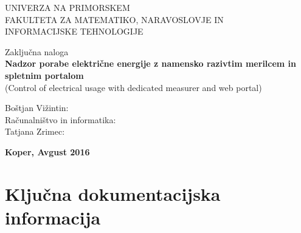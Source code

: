 \documentclass[12pt,a4paper,titlepage,openany]{report}
\begin{document}
\pagestyle{empty}
\begin{center}
\noindent \large UNIVERZA NA PRIMORSKEM\\
\large FAKULTETA ZA MATEMATIKO, NARAVOSLOVJE IN\\
INFORMACIJSKE TEHNOLOGIJE


\normalsize
\vspace{6cm}
Zaključna naloga\\
\textbf{\large Nadzor porabe električne energije z namensko razivtim merilcem in  spletnim portalom}\\
\normalsize
(Control of electrical usage with dedicated measurer and  web portal)\\
\end{center}

\begin{flushleft}
\vspace{5cm}
\noindent Boštjan Vižintin:
\\
\noindent Računalništvo in informatika:
\\
\noindent Tatjana Zrimec:
\\
\end{flushleft}

\vspace{4cm}
\begin{center}
\large \textbf{Koper, Avgust 2016}
\end{center}
\newpage

\pagestyle{fancy}

\section*{Ključna dokumentacijska informacija}
\end{document}
